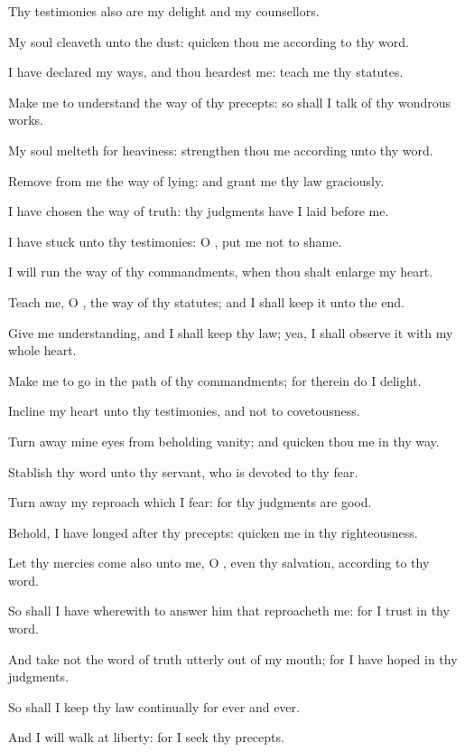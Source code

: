 \verse Thy testimonies also are my delight and my counsellors.

\verse My soul cleaveth unto the dust: quicken thou me according to thy word.

\verse I have declared my ways, and thou heardest me: teach me thy statutes.

\verse Make me to understand the way of thy precepts: so shall I talk of thy wondrous works.

\verse My soul melteth for heaviness: strengthen thou me according unto thy word.

\verse Remove from me the way of lying: and grant me thy law graciously.

\verse I have chosen the way of truth: thy judgments have I laid before me.

\verse I have stuck unto thy testimonies: O \LORD, put me not to shame.

\verse I will run the way of thy commandments, when thou shalt enlarge my heart.

\verse Teach me, O \LORD, the way of thy statutes; and I shall keep it unto the end.

\verse Give me understanding, and I shall keep thy law; yea, I shall observe it with my whole heart.

\verse Make me to go in the path of thy commandments; for therein do I delight.

\verse Incline my heart unto thy testimonies, and not to covetousness.

\verse Turn away mine eyes from beholding vanity; and quicken thou me in thy way.

\verse Stablish thy word unto thy servant, who is devoted to thy fear.

\verse Turn away my reproach which I fear: for thy judgments are good.

\verse Behold, I have longed after thy precepts: quicken me in thy righteousness.

\verse Let thy mercies come also unto me, O \LORD, even thy salvation, according to thy word.

\verse So shall I have wherewith to answer him that reproacheth me: for I trust in thy word.

\verse And take not the word of truth utterly out of my mouth; for I have hoped in thy judgments.

\verse So shall I keep thy law continually for ever and ever.

\verse And I will walk at liberty: for I seek thy precepts.

